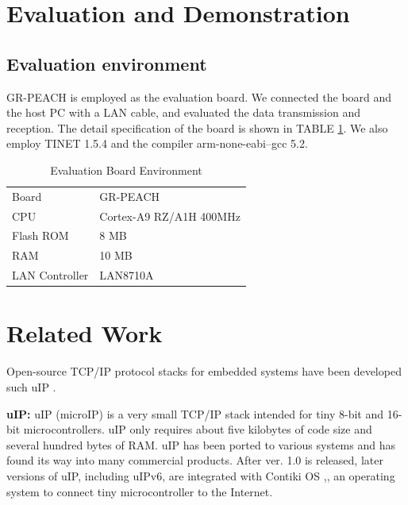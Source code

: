 \documentclass[conference]{IEEEtran/IEEEtran}
\begin{document}
\section{Evaluation and Demonstration}
\label{sec:Evaluation and Demonstration}

\subsection{Evaluation environment}

GR-PEACH is employed as the evaluation board.
We connected the board and the host PC with a LAN cable, and evaluated the data transmission and reception.
The detail specification of the board is shown in TABLE \ref{tab:EvaluationBoardEnvironment}.
We also employ TINET 1.5.4 and the compiler arm-none-eabi--gcc 5.2.

\begin{table}[t]
    \centering
    \caption{Evaluation Board Environment}
    \begin{tabular}{l|l}
        \hline\hline
        Board           &   GR-PEACH                \\
        CPU             &   Cortex-A9 RZ/A1H 400MHz \\
        Flash ROM       &   8 MB                    \\
        RAM             &   10 MB                   \\
        LAN Controller  &   LAN8710A                \\
        \hline
    \end{tabular}
    \label{tab:EvaluationBoardEnvironment}
\end{table}


\section{Related Work}
\label{sec:Related Work}

Open-source TCP/IP protocol stacks for embedded systems have been developed such uIP \cite{par:uIP}.

{\bf uIP:}
uIP (microIP) is a very small TCP/IP stack intended for tiny 8-bit and 16-bit microcontrollers.
uIP only requires about five kilobytes of code size and several hundred bytes of RAM.
uIP has been ported to various systems and has found its way into many commercial products.
After ver. 1.0 is released, later versions of uIP, including uIPv6, are integrated with Contiki OS \cite{par:Contiki},\cite{url:Contiki}, an operating system to connect tiny microcontroller to the Internet.
\end{document}
